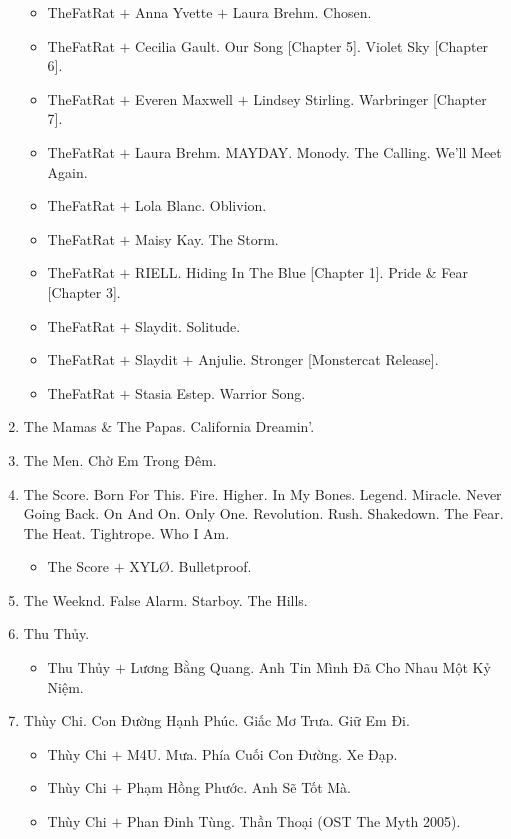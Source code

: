 \documentclass{article}
\begin{document}
\begin{enumerate}
\begin{itemize}
		\item {\sc TheFatRat $+$ Anna Yvette $+$ Laura Brehm.} Chosen.
		\item {\sc TheFatRat $+$ Cecilia Gault.} Our Song [Chapter 5]. Violet Sky [Chapter 6].
		\item {\sc TheFatRat $+$ Everen Maxwell $+$ Lindsey Stirling.} Warbringer [Chapter 7].
		\item {\sc TheFatRat $+$ Laura Brehm.} MAYDAY. Monody. The Calling. We'll Meet Again.
		\item {\sc TheFatRat $+$ Lola Blanc.} Oblivion.
		\item {\sc TheFatRat $+$ Maisy Kay.} The Storm.
		\item {\sc TheFatRat $+$ RIELL.} Hiding In The Blue [Chapter 1]. Pride \& Fear [Chapter 3].
		\item {\sc TheFatRat $+$ Slaydit.} Solitude.
		\item {\sc TheFatRat $+$ Slaydit $+$ Anjulie.} Stronger [Monstercat Release].
		\item {\sc TheFatRat $+$ Stasia Estep.} Warrior Song.
	\end{itemize}
	\item {\sc The Mamas \& The Papas.} California Dreamin'.
	\item {\sc The Men.} Chờ Em Trong Đêm.
	\item {\sc The Score.} Born For This. Fire. Higher. In My Bones. Legend. Miracle. Never Going Back. On And On. Only One. Revolution. Rush. Shakedown. The Fear. The Heat. Tightrope. Who I Am.
	\begin{itemize}
		\item {\sc The Score $+$ XYL\O.} Bulletproof.
	\end{itemize}
	\item {\sc The Weeknd.} False Alarm. Starboy. The Hills.
	\item {\sc Thu Thủy.}
	\begin{itemize}
		\item {\sc Thu Thủy $+$ Lương Bằng Quang.} Anh Tin Mình Đã Cho Nhau Một Kỷ Niệm.
	\end{itemize}
	\item {\sc Thùy Chi.} Con Đường Hạnh Phúc. Giấc Mơ Trưa. Giữ Em Đi.
	\begin{itemize}
		\item {\sc Thùy Chi $+$ M4U.} Mưa. Phía Cuối Con Đường. Xe Đạp.
		\item {\sc Thùy Chi $+$ Phạm Hồng Phước.} Anh Sẽ Tốt Mà.
		\item {\sc Thùy Chi $+$ Phan Đinh Tùng.} Thần Thoại (OST The Myth 2005).

\end{itemize}
\end{enumerate}
\end{document}
